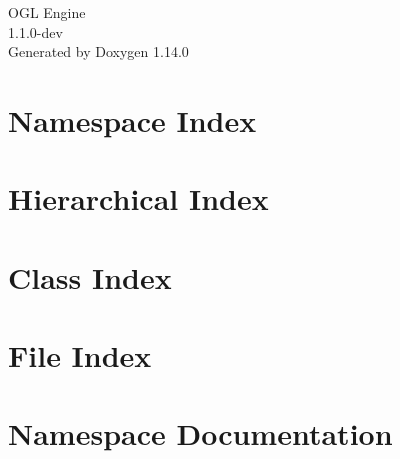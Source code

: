 \documentclass[twoside]{book}
\newcommand{\+}{\discretionary{\mbox{\scriptsize$\hookleftarrow$}}{}{}}
\newcommand{\clearemptydoublepage}{%
    \newpage{\pagestyle{empty}\cleardoublepage}%
  }
\begin{document}
  \raggedbottom
    \hypersetup{pageanchor=false,
                bookmarksnumbered=true,
                pdfencoding=unicode
               }
  \begin{titlepage}
  \vspace*{7cm}
  \begin{center}%
  {\Large OGL Engine}\\
  [1ex]\large 1.\+1.\+0-\/dev \\
  \vspace*{1cm}
  {\large Generated by Doxygen 1.14.0}\\
  \end{center}
  \end{titlepage}
  \clearemptydoublepage
  \tableofcontents
  \clearemptydoublepage
  \hypersetup{pageanchor=true}
\chapter{Namespace Index}

\chapter{Hierarchical Index}

\chapter{Class Index}

\chapter{File Index}

\chapter{Namespace Documentation}













\end{document}
